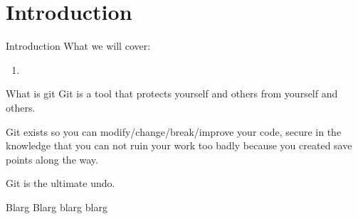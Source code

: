 \documentclass[../git.tex]{subfiles}
\begin{document}
\section{Introduction}


\begin{frame}[fragile]{Introduction}
    What we will cover:
    \begin{enumerate}
        \item
    \end{enumerate}
\end{frame}


\begin{frame}[fragile]{What is git}
    Git is a tool that protects yourself and others from yourself and others. \newline

    Git exists so you can modify/change/break/improve your code, secure in the
    knowledge that you can not ruin your work too badly because you created save
    points along the way.

    \note
    {
        Git is the ultimate undo.
    }
\end{frame}


\begin{frame}[fragile]{Blarg}
    Blarg blarg blarg
\end{frame}

\end{document}
